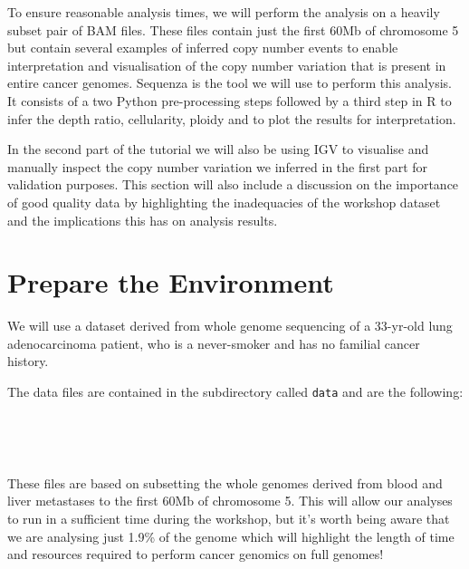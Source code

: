 To ensure reasonable analysis times, we will perform the analysis on a heavily subset pair of BAM files. These files contain just the first 60Mb of chromosome 5 but contain several examples of inferred copy number events to enable interpretation and visualisation of the copy number variation that is present in entire cancer genomes. Sequenza is the tool we will use to perform this analysis. It consists of a two Python pre-processing steps followed by a third step in R to infer the depth ratio, cellularity, ploidy and to plot the results for interpretation.

In the second part of the tutorial we will also be using IGV to visualise and manually inspect the copy number variation we inferred in the first part for validation purposes. This section will also include a discussion on the importance of good quality data by highlighting the inadequacies of the workshop dataset and the implications this has on analysis results.


\section{Prepare the Environment}

We will use a dataset derived from whole genome sequencing of a 33-yr-old lung adenocarcinoma patient, who is a never-smoker and has no familial cancer history. 

The data files are contained in the subdirectory called \texttt{data} and are the following:

\begin{description}[style=multiline,labelindent=1.5cm,align=left,leftmargin=2.5cm]
  \item[\texttt{normal.chr5.60Mb.bam} and \texttt{normal.chr5.60Mb.bam.bai}] \hfill\\
  \item[\texttt{tumour.chr5.60Mb.bam} and \texttt{tumour.chr5.60Mb.bam}] \hfill\\
\end{description}

These files are based on subsetting the whole genomes derived from blood and liver metastases to the first 60Mb of chromosome 5. This will allow our analyses to run in a sufficient time during the workshop, but it's worth being aware that we are analysing just 1.9\% of the genome which will highlight the length of time and resources required to perform cancer genomics on full genomes!\\

